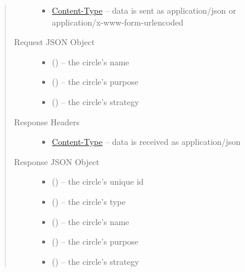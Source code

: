 \documentclass[letterpaper,10pt,english]{sphinxmanual}
\begin{document}
\begin{fulllineitems}
\begin{quote}
\begin{description}
\begin{itemize}
\item {} 
\href{http://tools.ietf.org/html/rfc7231\#section-3.1.1.5}{Content-Type} -- data is sent as application/json or
application/x-www-form-urlencoded

\end{itemize}

\item[{Request JSON Object}] \leavevmode\begin{itemize}
\item {} 
 () -- the circle's name

\item {} 
 () -- the circle's purpose

\item {} 
 () -- the circle's strategy

\end{itemize}

\item[{Response Headers}] \leavevmode\begin{itemize}
\item {} 
\href{http://tools.ietf.org/html/rfc7231\#section-3.1.1.5}{Content-Type} -- data is received as application/json

\end{itemize}

\item[{Response JSON Object}] \leavevmode\begin{itemize}
\item {} 
 () -- the circle's unique id

\item {} 
 () -- the circle's type

\item {} 
 () -- the circle's name

\item {} 
 () -- the circle's purpose

\item {} 
 () -- the circle's strategy


\end{itemize}
\end{description}
\end{quote}
\end{fulllineitems}
\end{document}
